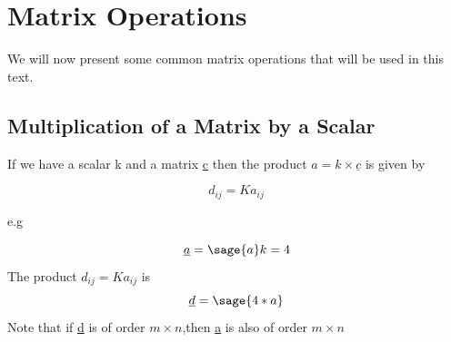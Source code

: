 \documentclass[12pt]{report}
\begin{document}

\section{Matrix Operations}

We will now present some common matrix operations that will be used in this text.

\subsection{Multiplication of a Matrix by a Scalar}

If we have a scalar k and a matrix \underline{c}
then the product $a = k \times \underline{c} $ is given by

\begin{equation}d_{{ij}} = Ka_{{ij}}
	\label{eq:element}
\end{equation}

e.g

$$\underline{a}=\sage{a}
	k= 4 $$
The product 
$d_{{ij}} = Ka_{{ij}}$ is 
$$\underline{d} = \sage{4*a}$$
Note that if \underline{d} is of order
$ m \times n $,then \underline{a} is 
also of order $ m \times n $

\end{document}
